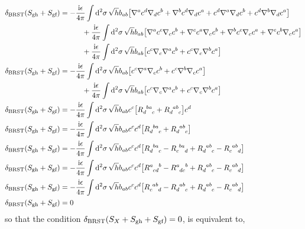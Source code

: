 \begin{align*}
    \delta_{\textnormal{BRST}}\qty(S_{\textnormal{gh}}+S_{\textnormal{gf}})&=-\frac{\im\epsilon}{4\pi}\int\dd[2]{\sigma}\sqrt{h}b_{ab}\qty[\nabla^{a}c^d\nabla_dc^{b}+\nabla^{b}c^d\nabla_dc^{a}+c^d\nabla^{a}\nabla_dc^{b}+c^d\nabla^{b}\nabla_dc^{a}]\\
    &\quad\quad\quad+\frac{\im\epsilon}{4\pi}\int\dd[2]{\sigma}\sqrt{h}b_{ab}\qty[\nabla^{a}c^{c}\nabla_cc^b+\nabla^{c}c^{a}\nabla_cc^b+\nabla^{b}c^{c}\nabla_cc^a+\nabla^{c}c^{b}\nabla_cc^a]\\
    &\quad\quad\quad+\frac{\im\epsilon}{4\pi}\int\dd[2]{\sigma}\sqrt{h}b_{ab}\qty[c^c\nabla_c\nabla^{a}c^{b}+ c^c\nabla_c\nabla^{b}c^{a}]\\
    \delta_{\textnormal{BRST}}\qty(S_{\textnormal{gh}}+S_{\textnormal{gf}})&=-\frac{\im\epsilon}{4\pi}\int\dd[2]{\sigma}\sqrt{h}b_{ab}\qty[c^c\nabla^{a}\nabla_cc^{b}+c^c\nabla^{b}\nabla_cc^{a}]\\
    &\quad\quad\quad+\frac{\im\epsilon}{4\pi}\int\dd[2]{\sigma}\sqrt{h}b_{ab}\qty[c^c\nabla_c\nabla^{a}c^{b}+ c^c\nabla_c\nabla^{b}c^{a}]\\
    \delta_{\textnormal{BRST}}\qty(S_{\textnormal{gh}}+S_{\textnormal{gf}})&=-\frac{\im\epsilon}{4\pi}\int\dd[2]{\sigma}\sqrt{h}b_{ab}c^c\qty[\tensor{R}{_d^b^a_c}+\tensor{R}{_d^a^b_c}]c^{d}\\
    \delta_{\textnormal{BRST}}\qty(S_{\textnormal{gh}}+S_{\textnormal{gf}})&=-\frac{\im\epsilon}{4\pi}\int\dd[2]{\sigma}\sqrt{h}b_{ab}c^cc^{d}\qty[\tensor{R}{_d^b^a_c}+\tensor{R}{_d^a^b_c}]\\
    \delta_{\textnormal{BRST}}\qty(S_{\textnormal{gh}}+S_{\textnormal{gf}})&=-\frac{\im\epsilon}{4\pi}\int\dd[2]{\sigma}\sqrt{h}b_{ab}c^cc^{d}\qty[\tensor{R}{_d^b^a_c}-\tensor{R}{_c^b^a_d}+\tensor{R}{_d^a^b_c}-\tensor{R}{_c^a^b_d}]\\
    \delta_{\textnormal{BRST}}\qty(S_{\textnormal{gh}}+S_{\textnormal{gf}})&=-\frac{\im\epsilon}{4\pi}\int\dd[2]{\sigma}\sqrt{h}b_{ab}c^cc^{d}\qty[\tensor{R}{^a_c_d^b}-\tensor{R}{^a_d_c^b}+\tensor{R}{_d^a^b_c}-\tensor{R}{_c^a^b_d}]\\
    \delta_{\textnormal{BRST}}\qty(S_{\textnormal{gh}}+S_{\textnormal{gf}})&=-\frac{\im\epsilon}{4\pi}\int\dd[2]{\sigma}\sqrt{h}b_{ab}c^cc^{d}\qty[\tensor{R}{_c^a^b_d}-\tensor{R}{_d^a^b_c}+\tensor{R}{_d^a^b_c}-\tensor{R}{_c^a^b_d}]\\
    \delta_{\textnormal{BRST}}\qty(S_{\textnormal{gh}}+S_{\textnormal{gf}})&=0
\end{align*}
so that the condition $\delta_{\textnormal{BRST}}\qty(S_X+S_{\textnormal{gh}}+S_{\textnormal{gf}})=0$, is equivalent to,
